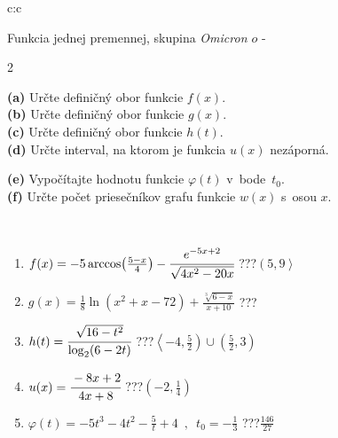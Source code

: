 \documentclass[10pt]{report}
\newcommand\omicron{o}
\begin{document}
\begin{tabular}{c:c}
\begin{minipage}[c][104.5mm][t]{0.5\linewidth}
\begin{center}
\vspace{7mm}
{\huge Funkcia jednej premennej, skupina \textit{Omicron $\omicron$} -}\\[5mm]
\begin{minipage}{0.95\linewidth}
\begin{center}
{\small \begin{multicols}{2} \raggedright
\textbf{(a)} Určte definičný obor funkcie \(f(x)\). \\[1mm]
\textbf{(b)} Určte definičný obor funkcie \(g(x)\). \\[1mm]
\textbf{(c)} Určte definičný obor funkcie \(h(t)\). \\[1mm]
\textbf{(d)} Určte interval, na ktorom je funkcia \(u(x)\) nezáporná. \par \columnbreak
\textbf{(e)} Vypočítajte hodnotu funkcie \(\varphi(t)\) v~bode~\(t_0\). \\[1mm]
\textbf{(f)} Určte počet priesečníkov grafu funkcie \(w(x)\) s~osou \(x\). \\[1mm]
\end{multicols}
}
\end{center}
\end{minipage}
\\[4mm]
\begin{minipage}{0.79\linewidth}
\begin{center}
\begin{varwidth}{\linewidth}
\begin{enumerate}
\small
\item $f(x) = -5\arccos\!\left( \frac{5-x}{4} \right) - \cfrac{e^{-5x+2}}{\sqrt{4x^2-20x}}$\quad \dotfill\; ???\;\dotfill \quad $\left(5 , 9\right\rangle$
\item $g(x) = \frac{1}{8} \ln{\!(x^2+x-72)}+\frac{\sqrt[3]{6-x}}{x+10}$\quad \dotfill\; ???\;\dotfill {}
\item $h(t) = \cfrac{\sqrt{16-t^2}}{\log_2(6-2t)}$\quad \dotfill\; ???\;\dotfill \quad $\left\langle-4 , \frac{5}{2}\right)\cup\left(\frac{5}{2} , 3\right)$
\item $u(x) = \cfrac{-8x+2}{4x+8}$\quad \dotfill\; ???\;\dotfill \quad $\left(-2 , \frac{1}{4}\right)$
\item $\varphi(t) = -5t^3-4t^2-\frac{5}{t}+4 \enspace , \enspace t_0=-\frac{1}{3}$\quad \dotfill\; ???\;\dotfill \quad $\frac{146}{27}$

\end{enumerate}
\end{varwidth}
\end{center}
\end{minipage}
\end{center}
\end{minipage}
\end{tabular}
\end{document}
